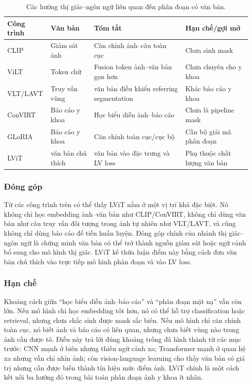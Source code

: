 \begin{table}[!t]
  \centering
  \caption{Các hướng thị giác--ngôn ngữ liên quan đến phân đoạn có văn bản.}
  \label{tab:vl-related-works}
  \scriptsize
  \renewcommand{\arraystretch}{1.15}
  \setlength{\tabcolsep}{5pt}
  \begin{tabularx}{\textwidth}{@{}l L L L@{}}
    \toprule
    Công trình & Văn bản & Tóm tắt & Hạn chế/gợi mở \\
    \midrule
    CLIP \cite{radford2021clip} & Giám sát ảnh & Căn chỉnh ảnh--câu toàn cục & Chưa sinh mask \\
    ViLT \cite{kim2021vilt} & Token chữ & Fusion token ảnh--văn bản gọn hơn & Chưa chuyên cho y khoa \\
    VLT/LAVT \cite{ding2021vlt,yang2022lavt} & Truy vấn vùng & văn bản điều khiển referring segmentation & Khác báo cáo y khoa \\
    ConVIRT \cite{zhang2020convirt} & Báo cáo y khoa & Học biểu diễn ảnh--báo cáo & Chưa là pipeline mask \\
    GLoRIA \cite{huang2021gloria} & Báo cáo y khoa & Căn chỉnh toàn cục/cục bộ & Cần bộ giải mã phân đoạn \\
    LViT \cite{li2023lvit} & văn bản chú thích & văn bản vào đặc trưng và LV loss & Phụ thuộc chất lượng văn bản \\
    \bottomrule
  \end{tabularx}
\end{table}
\FloatBarrier

\subsubsection{Đóng góp}

Từ các công trình trên có thể thấy LViT nằm ở một vị trí khá đặc biệt. Nó không chỉ học embedding ảnh--văn bản như CLIP/ConVIRT, không chỉ dùng văn bản như câu truy vấn đối tượng trong ảnh tự nhiên như VLT/LAVT, và cũng không chỉ dùng báo cáo để tiền huấn luyện. Đóng góp chính của nhánh thị giác--ngôn ngữ là chứng minh văn bản có thể trở thành nguồn giám sát hoặc ngữ cảnh bổ sung cho mô hình thị giác. LViT kế thừa luận điểm này bằng cách đưa văn bản chú thích vào trực tiếp mô hình phân đoạn và vào LV loss.

\subsubsection{Hạn chế}

Khoảng cách giữa ``học biểu diễn ảnh--báo cáo'' và ``phân đoạn mặt nạ'' vẫn còn lớn. Nếu mô hình chỉ học embedding tốt hơn, nó có thể hỗ trợ classification hoặc retrieval, nhưng chưa chắc sinh được mask sắc biên. Nếu mô hình chỉ căn chỉnh toàn cục, nó biết ảnh và báo cáo có liên quan, nhưng chưa biết vùng nào trong ảnh cần được tô. Điều này trả lời đúng khoảng trống đã hình thành từ các mục trước: CNN mạnh ở biên nhưng thiếu ngữ cảnh xa; Transformer mạnh ở quan hệ xa nhưng vẫn chỉ nhìn ảnh; còn vision-language learning cho thấy văn bản có giá trị nhưng cần được biến thành tín hiệu mức điểm ảnh. LViT chính là một cách kết nối ba hướng đó trong bài toán phân đoạn ảnh y khoa ít nhãn.

